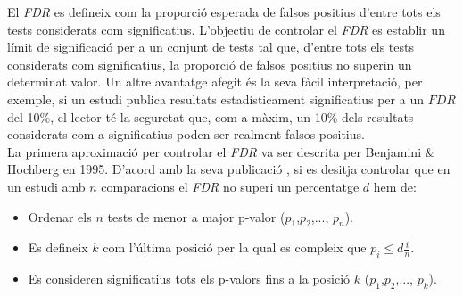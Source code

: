 \documentclass[english]{article}
\begin{document}
El  \emph{FDR} es defineix com la proporció esperada de falsos positius d'entre tots els tests considerats com significatius. L'objectiu de controlar el \emph{FDR} es establir un límit de significació per a un conjunt de tests tal que, d'entre tots els tests considerats com significatius, la proporció de falsos positius no superin un determinat valor.
Un altre avantatge afegit és la seva fàcil interpretació, per exemple, si un estudi publica resultats estadísticament significatius per a un $FDR$ del 10$\%$, el lector té la seguretat que, com a màxim, un 10$\%$ dels resultats considerats com a significatius poden ser realment falsos positius.
\\
La primera aproximació per controlar el \emph{FDR} va ser descrita per Benjamini $\&$ Hochberg en 1995. D'acord amb la seva publicació \cite{fdr}, si es desitja controlar que en un estudi amb $n$ comparacions el \emph{FDR} no superi un percentatge $d$ hem de:

\begin{itemize}
\item Ordenar els $n$ tests de menor a major p-valor ($p_{1}$,$p_{2}$,..., $p_n$).
\item Es defineix $k$ com l'última posició per la qual es compleix que $p_i \leq d\frac{i}{n}$.
\item Es consideren significatius tots els p-valors fins a la posició $k$ ($p_{1}$,$p_{2}$,..., $p_k$).

\end{itemize}
\end{document}
